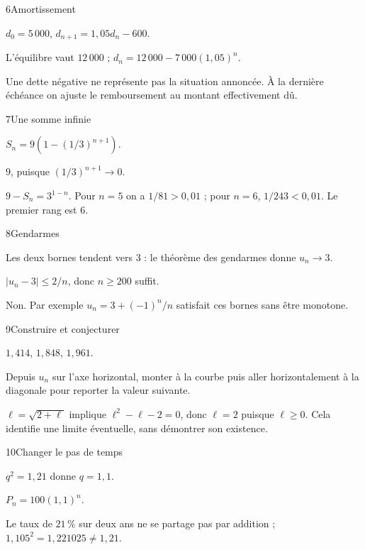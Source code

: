 \begin{corrige}{6}{Amortissement}
\begin{questions}
\item $d_0=5\,000$, $d_{n+1}=1{,}05d_n-600$.
\item L’équilibre vaut $12\,000$ ; $d_n=12\,000-7\,000(1{,}05)^n$.
\item Une dette négative ne représente pas la situation annoncée. À la dernière échéance on ajuste le remboursement au montant effectivement dû.
\end{questions}
\end{corrige}
\begin{corrige}{7}{Une somme infinie}
\begin{questions}
\item $S_n=9(1-(1/3)^{n+1})$.
\item $9$, puisque $(1/3)^{n+1}\to0$.
\item $9-S_n=3^{1-n}$. Pour $n=5$ on a $1/81>0{,}01$ ; pour $n=6$, $1/243<0{,}01$. Le premier rang est $6$.
\end{questions}
\end{corrige}
\begin{corrige}{8}{Gendarmes}
\begin{questions}
\item Les deux bornes tendent vers $3$ : le théorème des gendarmes donne $u_n\to3$.
\item $|u_n-3|\leq2/n$, donc $n\geq200$ suffit.
\item Non. Par exemple $u_n=3+(-1)^n/n$ satisfait ces bornes sans être monotone.
\end{questions}
\end{corrige}
\begin{corrige}{9}{Construire et conjecturer}
\begin{questions}
\item $1{,}414$, $1{,}848$, $1{,}961$.
\item Depuis $u_n$ sur l’axe horizontal, monter à la courbe puis aller horizontalement à la diagonale pour reporter la valeur suivante.
\item $\ell=\sqrt{2+\ell}$ implique $\ell^2-\ell-2=0$, donc $\ell=2$ puisque $\ell\geq0$. Cela identifie une limite éventuelle, sans démontrer son existence.
\end{questions}
\end{corrige}
\begin{corrige}{10}{Changer le pas de temps}
\begin{questions}
\item $q^2=1{,}21$ donne $q=1{,}1$.
\item $P_n=100(1{,}1)^n$.
\item Le taux de $21\,\%$ sur deux ans ne se partage pas par addition ; $1{,}105^2=1{,}221025\ne1{,}21$.
\end{questions}
\end{corrige}
